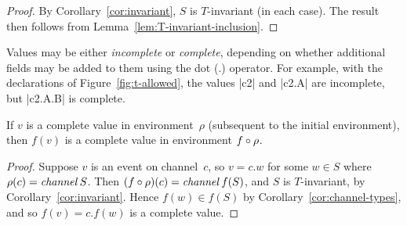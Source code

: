 \begin{proof}
By Corollary~\ref{cor:invariant}, $S$ is $T$-invariant (in each case).  The
result then follows from Lemma~\ref{lem:T-invariant-inclusion}.
\end{proof}


Values may be either \emph{incomplete} or \emph{complete}, depending on
whether additional fields may be added to them using the dot ($.$) operator.
For example, with the declarations of Figure~\ref{fig:t-allowed}, the values
|c2| and |c2.A| are incomplete, but |c2.A.B| is complete.  

\begin{lemma}
\label{lem:complete}
If $v$ is a complete value in environment~$\rho$ (subsequent to the initial
environment), then $f(v)$ is a complete value in environment $f\circ\rho$.
\end{lemma}

\begin{proof}
Suppose $v$ is an event on channel~$c$, so $v = c.w$ for some $w \in S$ where
$\rho(c) = \mathop{\it channel} S$.  Then $(f\circ\rho)(c) = \mathop{\it channel} f(S)$, and $S$ is
$T$-invariant, by Corollary~\ref{cor:invariant}.  Hence $f(w) \in f(S)$ by
Corollary~\ref{cor:channel-types}, and so $f(v) = c.f(w)$ is a complete
value. 
\end{proof}
